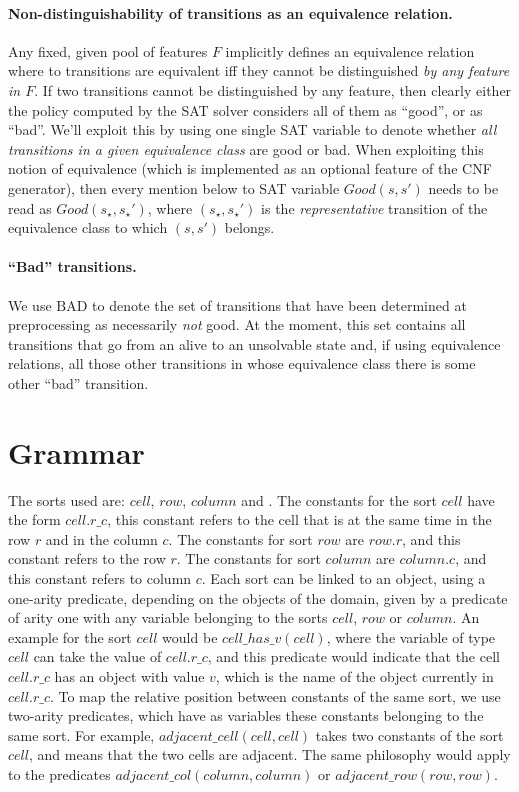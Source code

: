 \documentclass[a4paper]{article}
\newcommand{\badtx}{\ensuremath{\mathrm{BAD}}}
\begin{document}
\paragraph{Non-distinguishability of transitions as an equivalence relation.}
Any fixed, given pool of features $F$ implicitly defines an equivalence relation where to transitions are
equivalent iff they cannot be distinguished \emph{by any feature in $F$}.
If two transitions cannot be distinguished by any feature, then clearly either the policy computed by the SAT solver
considers all of them as ``good'', or as ``bad''.
We'll exploit this by using one single SAT variable to denote whether \emph{all transitions in a given equivalence
class} are good or bad. When exploiting this notion of equivalence (which is implemented as an optional feature of
the CNF generator), then every mention below to SAT variable $Good(s, s')$ needs to be read as $Good(s_{\star}, s_{\star}')$,
where $(s_{\star}, s_{\star}')$ is the \emph{representative} transition of the equivalence class to which $(s, s')$ belongs.

\paragraph{``Bad'' transitions.}
We use \badtx{} to denote the set of transitions that have been determined at preprocessing as necessarily
\emph{not} good.
At the moment, this set contains all transitions that go from an alive to an unsolvable state and, if using
equivalence relations, all those other transitions in whose equivalence class there is some other ``bad'' transition.

\newpage

\section{Grammar}

The sorts used are: $cell$, $row$, $column$ and . The constants for the sort $cell$ have the form $cell.r\_c$, this constant refers to the cell that is at the same time in the row $r$ and in the column $c$. The constants for sort $row$ are $row.r$, and this constant refers to the row $r$. The constants for sort $column$ are $column.c$, and this constant refers to column $c$. Each sort can be linked to an object, using a one-arity predicate, depending on the objects of the domain, given by a predicate of arity one with any variable belonging to the sorts $cell$, $row$ or $column$. An example for the sort $cell$ would be $cell\_has\_v(cell)$, where the variable of type $cell$ can take the value of $cell.r\_c$, and this predicate would indicate that the cell $cell.r\_c$ has an object with value $v$, which is the name of the object currently in $cell.r\_c$. To map the relative position between constants of the same sort, we use two-arity predicates, which have as variables these constants belonging to the same sort. For example, $adjacent\_cell(cell, cell)$ takes two constants of the sort $cell$, and means that the two cells are adjacent. The same philosophy would apply to the predicates $adjacent\_col(column, column)$ or $adjacent\_row(row, row)$.
\end{document}
